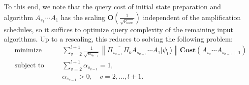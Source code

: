 \documentclass[letterpaper,onecolumn,11pt,accepted=2026-02-14]{quantumarticle}
\newcommand{\norm}[1]{\left\lVert#1\right\rVert}
\theoremstyle{remark}
\theoremstyle{plain}
\newcommand{\ket}[1]{|#1\rangle}
\begin{document}
To this end, we note that the query cost of initial state preparation and algorithm $A_{s_1}\cdots A_1$ has the scaling $\mathbf{O}\left(\frac{1}{\sqrt{p_{\text{succ}}}}\right)$ independent of the amplification schedules, so it suffices to optimize query complexity of the remaining input algorithms. Up to a rescaling, this reduces to solving the following problem:
\begin{equation}
\begin{aligned}
    &\mathrm{minimize} \quad && \sum_{v=2}^{l+1}\frac{1}{\sqrt{\alpha_{s_{v-1}}}}
    \norm{\overline{\Pi_{s_{v-1}}\Pi_b}A_{s_{v-1}}\cdots A_1\ket{\psi_0}}\mathbf{Cost}\left(A_{s_v}\cdots A_{s_{v-1}+1}\right)\\
    &\textrm{subject to}\quad &&\sum_{v=2}^{l+1}\alpha_{s_{v-1}}=1,\\
    & &&\alpha_{s_{v-1}}>0,\quad v=2,\ldots,l+1.
\end{aligned}
\end{equation}
\end{document}
